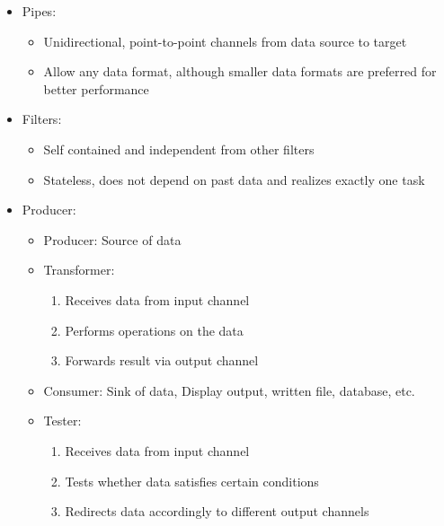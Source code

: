 \documentclass[
../../Software_Engineering_Summary.tex,
]
{subfiles}
\begin{document}
\begin{defbox}
    \begin{itemize}
        \item Pipes:
        \begin{itemize}
            \item Unidirectional, point-to-point channels from data source to target
            \item Allow any data format, although smaller data formats are preferred for better performance
        \end{itemize}
        \item Filters:
        \begin{itemize}
            \item Self contained and independent from other filters
            \item Stateless, does not depend on past data and realizes exactly one task
        \end{itemize}
    \end{itemize}
\end{defbox}

\begin{defbox}
    \begin{itemize}
        \item Producer:
        \begin{itemize}
            \item Producer: Source of data
            \item Transformer:
            \begin{enumerate}
                \item Receives data from input channel
                \item Performs operations on the data
                \item Forwards result via output channel
            \end{enumerate}
            \item Consumer: Sink of data, Display output, written file, database, etc.
            \item Tester:
            \begin{enumerate}
                \item Receives data from input channel
                \item Tests whether data satisfies certain conditions
                \item Redirects data accordingly to different output channels
            \end{enumerate}
        \end{itemize}
    \end{itemize}
\end{defbox}
\end{document}
